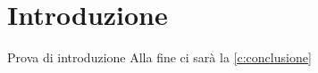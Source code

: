 \chapter{Introduzione}\label{c:introduzione}

Prova di introduzione
Alla fine ci sarà la \ref{c:conclusione}
